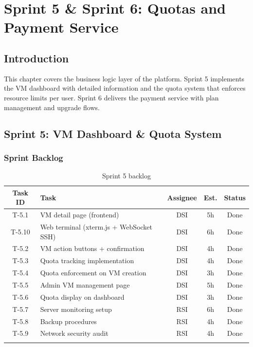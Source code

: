 \chapter{Sprint 5 \& Sprint 6: Quotas and Payment Service}

\section{Introduction}

This chapter covers the business logic layer of the platform. Sprint 5 implements the VM dashboard with detailed information and the quota system that enforces resource limits per user. Sprint 6 delivers the payment service with plan management and upgrade flows.

\section{Sprint 5: VM Dashboard \& Quota System}


\subsection{Sprint Backlog}

\begin{longtable}{|c|p{5cm}|c|c|c|}
\hline
\rowcolor{blue!15}
\textbf{Task ID} & \textbf{Task} & \textbf{Assignee} & \textbf{Est.} & \textbf{Status} \\
\hline
\endhead
T-5.1 & VM detail page (frontend) & DSI & 5h & Done \\
\hline
T-5.10 & Web terminal (xterm.js + WebSocket SSH) & DSI & 6h & Done \\
\hline
T-5.2 & VM action buttons + confirmation & DSI & 4h & Done \\
\hline
T-5.3 & Quota tracking implementation & DSI & 4h & Done \\
\hline
T-5.4 & Quota enforcement on VM creation & DSI & 3h & Done \\
\hline
T-5.5 & Admin VM management page & DSI & 5h & Done \\
\hline
T-5.6 & Quota display on dashboard & DSI & 3h & Done \\
\hline
T-5.7 & Server monitoring setup & RSI & 6h & Done \\
\hline
T-5.8 & Backup procedures & RSI & 4h & Done \\
\hline
T-5.9 & Network security audit & RSI & 4h & Done \\
\hline
\caption{Sprint 5 backlog}
\label{tab:sprint5-backlog}
\end{longtable}

